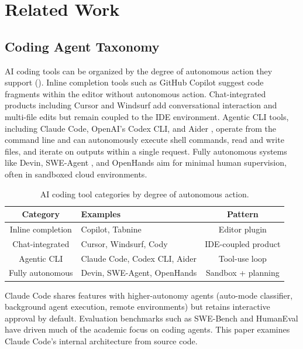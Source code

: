 \section{Related Work}
\label{sec:related}

\subsection{Coding Agent Taxonomy}
\label{sec:related:taxonomy}

AI coding tools can be organized by the degree of autonomous action they support (). Inline completion tools such as GitHub Copilot \citep{chen2021evaluating} suggest code fragments within the editor without autonomous action. Chat-integrated products including Cursor and Windsurf add conversational interaction and multi-file edits but remain coupled to the IDE environment. Agentic CLI tools, including Claude Code, OpenAI's Codex CLI, and Aider \citep{gauthier2024aider}, operate from the command line and can autonomously execute shell commands, read and write files, and iterate on outputs within a single request. Fully autonomous systems like Devin, SWE-Agent \citep{yang2024sweagent}, and OpenHands \citep{wang2024openhands} aim for minimal human supervision, often in sandboxed cloud environments.

\begin{table}[t]
\centering
\caption{AI coding tool categories by degree of autonomous action.}
\label{tab:tool-taxonomy}
\small
\begin{tabularx}{\columnwidth}{>{\centering\arraybackslash}c >{\centering\arraybackslash}X >{\centering\arraybackslash}c}
\toprule
\textbf{Category} & \textbf{Examples} & \textbf{Pattern} \\
\midrule
Inline completion & Copilot, Tabnine & Editor plugin \\
Chat-integrated & Cursor, Windsurf, Cody & IDE-coupled product \\
Agentic CLI & Claude Code, Codex CLI, Aider & Tool-use loop \\
Fully autonomous & Devin, SWE-Agent, OpenHands & Sandbox + planning \\
\bottomrule
\end{tabularx}
\end{table}

Claude Code shares features with higher-autonomy agents (auto-mode classifier, background agent execution, remote environments) but retains interactive approval by default. Evaluation benchmarks such as SWE-Bench \citep{jimenez2024swebench} and HumanEval \citep{chen2021evaluating} have driven much of the academic focus on coding agents. This paper examines Claude Code's internal architecture from source code.

